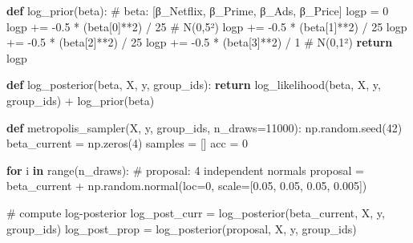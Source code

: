 \documentclass[
  letterpaper,
  DIV=11,
  numbers=noendperiod]{scrartcl}
\newenvironment{Shaded}{\begin{snugshade}}{\end{snugshade}}
\newcommand{\BuiltInTok}[1]{\textcolor[rgb]{0.00,0.23,0.31}{#1}}
\newcommand{\CommentTok}[1]{\textcolor[rgb]{0.37,0.37,0.37}{#1}}
\newcommand{\ControlFlowTok}[1]{\textcolor[rgb]{0.00,0.23,0.31}{\textbf{#1}}}
\newcommand{\DecValTok}[1]{\textcolor[rgb]{0.68,0.00,0.00}{#1}}
\newcommand{\FloatTok}[1]{\textcolor[rgb]{0.68,0.00,0.00}{#1}}
\newcommand{\KeywordTok}[1]{\textcolor[rgb]{0.00,0.23,0.31}{\textbf{#1}}}
\newcommand{\NormalTok}[1]{\textcolor[rgb]{0.00,0.23,0.31}{#1}}
\newcommand{\OperatorTok}[1]{\textcolor[rgb]{0.37,0.37,0.37}{#1}}
\begin{document}
\begin{Shaded}
\begin{Highlighting}[]
\KeywordTok{def}\NormalTok{ log\_prior(beta):}
    \CommentTok{\# beta: [β\_Netflix, β\_Prime, β\_Ads, β\_Price]}
\NormalTok{    logp }\OperatorTok{=} \DecValTok{0}
\NormalTok{    logp }\OperatorTok{+=} \OperatorTok{{-}}\FloatTok{0.5} \OperatorTok{*}\NormalTok{ (beta[}\DecValTok{0}\NormalTok{]}\OperatorTok{**}\DecValTok{2}\NormalTok{) }\OperatorTok{/} \DecValTok{25}  \CommentTok{\# N(0,5²)}
\NormalTok{    logp }\OperatorTok{+=} \OperatorTok{{-}}\FloatTok{0.5} \OperatorTok{*}\NormalTok{ (beta[}\DecValTok{1}\NormalTok{]}\OperatorTok{**}\DecValTok{2}\NormalTok{) }\OperatorTok{/} \DecValTok{25}
\NormalTok{    logp }\OperatorTok{+=} \OperatorTok{{-}}\FloatTok{0.5} \OperatorTok{*}\NormalTok{ (beta[}\DecValTok{2}\NormalTok{]}\OperatorTok{**}\DecValTok{2}\NormalTok{) }\OperatorTok{/} \DecValTok{25}
\NormalTok{    logp }\OperatorTok{+=} \OperatorTok{{-}}\FloatTok{0.5} \OperatorTok{*}\NormalTok{ (beta[}\DecValTok{3}\NormalTok{]}\OperatorTok{**}\DecValTok{2}\NormalTok{) }\OperatorTok{/} \DecValTok{1}   \CommentTok{\# N(0,1²)}
    \ControlFlowTok{return}\NormalTok{ logp}

\KeywordTok{def}\NormalTok{ log\_posterior(beta, X, y, group\_ids):}
    \ControlFlowTok{return}\NormalTok{ log\_likelihood(beta, X, y, group\_ids) }\OperatorTok{+}\NormalTok{ log\_prior(beta)}

\KeywordTok{def}\NormalTok{ metropolis\_sampler(X, y, group\_ids, n\_draws}\OperatorTok{=}\DecValTok{11000}\NormalTok{):}
\NormalTok{    np.random.seed(}\DecValTok{42}\NormalTok{)}
\NormalTok{    beta\_current }\OperatorTok{=}\NormalTok{ np.zeros(}\DecValTok{4}\NormalTok{)}
\NormalTok{    samples }\OperatorTok{=}\NormalTok{ []}
\NormalTok{    acc }\OperatorTok{=} \DecValTok{0}

    \ControlFlowTok{for}\NormalTok{ i }\KeywordTok{in} \BuiltInTok{range}\NormalTok{(n\_draws):}
        \CommentTok{\# proposal: 4 independent normals}
\NormalTok{        proposal }\OperatorTok{=}\NormalTok{ beta\_current }\OperatorTok{+}\NormalTok{ np.random.normal(loc}\OperatorTok{=}\DecValTok{0}\NormalTok{, scale}\OperatorTok{=}\NormalTok{[}\FloatTok{0.05}\NormalTok{, }\FloatTok{0.05}\NormalTok{, }\FloatTok{0.05}\NormalTok{, }\FloatTok{0.005}\NormalTok{])}

        \CommentTok{\# compute log{-}posterior}
\NormalTok{        log\_post\_curr }\OperatorTok{=}\NormalTok{ log\_posterior(beta\_current, X, y, group\_ids)}
\NormalTok{        log\_post\_prop }\OperatorTok{=}\NormalTok{ log\_posterior(proposal, X, y, group\_ids)}


\end{Highlighting}
\end{Shaded}
\end{document}
